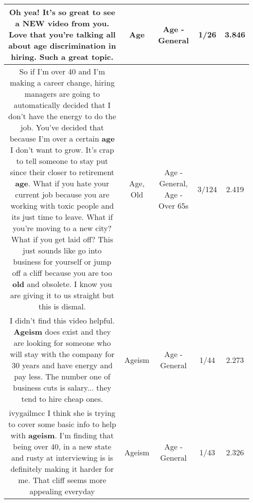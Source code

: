 \documentclass[11pt]{article}
\newlength\mylength
\begin{document}
\begin{center}
\begin{longtable}{|C{.65\mylength}|C{.30\mylength}|C{.12\mylength}|C{.12\mylength}|C{.12\mylength}|}
  \small Oh yea! It's so great to see a NEW video from you. Love that you're talking all about \textbf{age} discrimination in hiring. Such a great topic.\normalsize   & Age & Age - General & 1/26 & 3.846 \\  \hline
  \small So if I'm over 40 and I'm making a career change, hiring managers are going to automatically decided that I don't have the energy to do the job.  You've decided that because I'm over a certain \textbf{age} I don't want to grow. It's crap to tell someone to stay put since their closer to retirement \textbf{age}. What if you hate your current job because you are working with toxic people and its just time to leave.  What if you're moving to a new city? What if you get laid off? This just sounds like go into business for yourself or jump off a cliff because you are too \textbf{old} and obsolete. I know you are giving it to us straight but this is dismal.\normalsize   & Age, Old & Age - General, Age - Over 65s & 3/124 & 2.419 \\  \hline
  \small I didn't find this video helpful. \textbf{Ageism} does exist and they are looking for someone who will stay with the company for 30 years and have energy and pay less. The number one of business cuts is salary... they tend to hire cheap ones.\normalsize   & Ageism & Age - General & 1/44 & 2.273 \\  \hline
  \small ivygailmcc I think she is trying to cover some basic info to help with \textbf{ageism}. I'm finding that being over 40, in a new state and rusty at interviewing is is definitely making it harder for me. That cliff seems more appealing everyday\normalsize   & Ageism & Age - General & 1/43 & 2.326 \\  \hline

\end{longtable}
\end{center}
\end{document}
